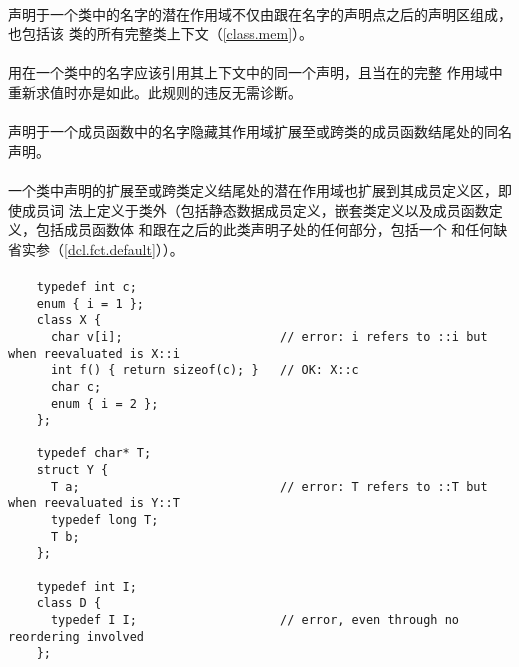 \paragraph{} %
声明于一个类中的名字的潜在作用域不仅由跟在名字的声明点之后的声明区组成，也包括该
类的所有完整类上下文（\ref{class.mem}）。

\paragraph{} %
用在一个类中的名字应该引用其上下文中的同一个声明，且当在的完整
作用域中重新求值时亦是如此。此规则的违反无需诊断。

\paragraph{} %
声明于一个成员函数中的名字隐藏其作用域扩展至或跨类的成员函数结尾处的同名声明。

\paragraph{} %
一个类中声明的扩展至或跨类定义结尾处的潜在作用域也扩展到其成员定义区，即使成员词
法上定义于类外（包括静态数据成员定义，嵌套类定义以及成员函数定义，包括成员函数体
和跟在之后的此类声明子处的任何部分，包括一个
和任何缺省实参（\ref{dcl.fct.default}））。

\paragraph{} %
\begin{example}
  \begin{lstlisting}
    typedef int c;
    enum { i = 1 };
    class X {
      char v[i];                      // error: i refers to ::i but when reevaluated is X::i
      int f() { return sizeof(c); }   // OK: X::c
      char c;
      enum { i = 2 };
    };

    typedef char* T;
    struct Y {
      T a;                            // error: T refers to ::T but when reevaluated is Y::T
      typedef long T;
      T b;
    };

    typedef int I;
    class D {
      typedef I I;                    // error, even through no reordering involved
    };
  \end{lstlisting}
\end{example}

